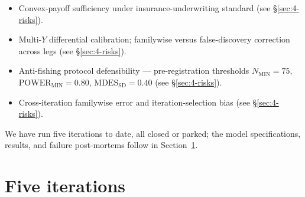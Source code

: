 \begin{description}
\begin{itemize}
    \item Convex-payoff sufficiency under insurance-underwriting standard (see \S\ref{sec:4-risks}).
    \item Multi-\(Y\) differential calibration; familywise versus false-discovery correction across legs (see \S\ref{sec:4-risks}).
    \item Anti-fishing protocol defensibility --- pre-registration thresholds \(N_{\mathrm{MIN}}=75\), \(\mathrm{POWER}_{\mathrm{MIN}}=0.80\), \(\mathrm{MDES}_{\mathrm{SD}}=0.40\) (see \S\ref{sec:4-risks}).
    \item Cross-iteration familywise error and iteration-selection bias (see \S\ref{sec:4-risks}).
  \end{itemize}
  \item[Bridge to \S2.] We have run five iterations to date, all closed or parked; the model specifications, results, and failure post-mortems follow in Section~\ref{sec:2}.
\end{description}

\section{Five iterations}\label{sec:2}

